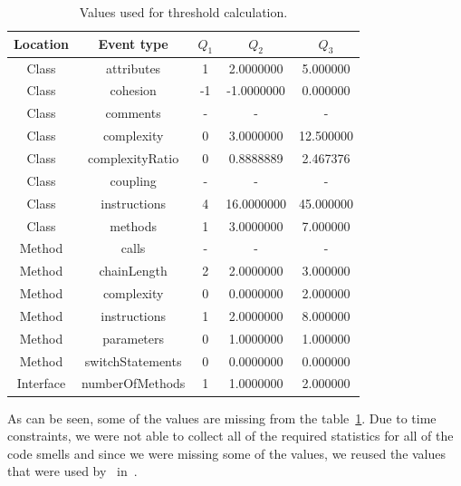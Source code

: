 \begin{table}
    \begin{center}
        \begin{tabular} {| c | c | c | c | c |}
            \hline
            \textbf{Location} & \textbf{Event type} & \textbf{$Q_1$} & \textbf{$Q_2$} & \textbf{$Q_3$} \\ \hline
            Class & attributes & 1 & 2.0000000 & 5.000000 \\ \hline
            Class & cohesion & -1 & -1.0000000 & 0.000000  \\ \hline
            Class & comments & - & - & - \\ \hline
            Class & complexity & 0 & 3.0000000 & 12.500000 \\ \hline
            Class & complexityRatio & 0 & 0.8888889 & 2.467376 \\ \hline
            Class & coupling & - & - & - \\ \hline
            Class & instructions & 4 & 16.0000000 & 45.000000 \\ \hline
            Class & methods & 1 & 3.0000000 & 7.000000 \\ \hline
            Method & calls & - & - & - \\ \hline
            Method & chainLength & 2 & 2.0000000 & 3.000000 \\ \hline
            Method & complexity & 0 & 0.0000000 & 2.000000 \\ \hline
            Method & instructions & 1 & 2.0000000 & 8.000000 \\ \hline
            Method & parameters & 0 & 1.0000000 & 1.000000 \\ \hline
            Method & switchStatements & 0 & 0.0000000 & 0.000000 \\ \hline
            Interface & numberOfMethods & 1 & 1.0000000 & 2.000000 \\ \hline
        \end{tabular}
        \caption{\label{threshold_calculation_table}Values used for threshold calculation.}
    \end{center}
\end{table}

As can be seen, some of the values are missing from the table~\ref{threshold_calculation_table}.
Due to time constraints, we were not able to collect all of the required statistics for all of the code smells
and since we were missing some of the values, we reused the values that were used by~\citeauthor{ios_code_smell_paper} in~\cite{ios_code_smell_paper}.

